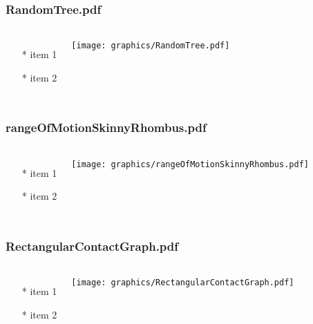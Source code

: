 \begin{frame} \frametitle{RandomTree.pdf}
    \begin{columns}[c]
        \begin{itemize}
            \item[*] item 1
            \item[*] item 2
        \end{itemize}
        \begin{minipage}{\linewidth}
            \begin{center}
            \texttt{[image: graphics/RandomTree.pdf]}
            \label{gfx:RandomTree.pdf}
            \end{center}
        \end{minipage}
    \end{columns}
\end{frame}
\begin{frame} \frametitle{rangeOfMotionSkinnyRhombus.pdf}
    \begin{columns}[c]
        \begin{itemize}
            \item[*] item 1
            \item[*] item 2
        \end{itemize}
        \begin{minipage}{\linewidth}
            \begin{center}
            \texttt{[image: graphics/rangeOfMotionSkinnyRhombus.pdf]}
            \label{gfx:rangeOfMotionSkinnyRhombus.pdf}
            \end{center}
        \end{minipage}
    \end{columns}
\end{frame}
\begin{frame} \frametitle{RectangularContactGraph.pdf}
    \begin{columns}[c]
        \begin{itemize}
            \item[*] item 1
            \item[*] item 2
        \end{itemize}
        \begin{minipage}{\linewidth}
            \begin{center}
            \texttt{[image: graphics/RectangularContactGraph.pdf]}
            \label{gfx:RectangularContactGraph.pdf}
            \end{center}
        \end{minipage}
    \end{columns}
\end{frame}
